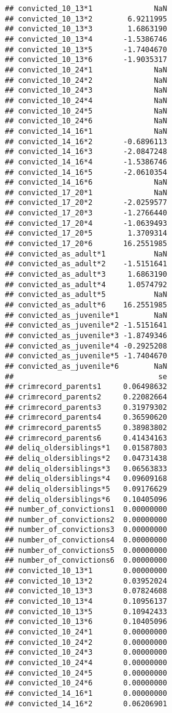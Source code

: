 \documentclass[]{tufte-handout}
\begin{document}
\begin{verbatim}
## convicted_10_13*1              NaN
## convicted_10_13*2        6.9211995
## convicted_10_13*3        1.6863190
## convicted_10_13*4       -1.5386746
## convicted_10_13*5       -1.7404670
## convicted_10_13*6       -1.9035317
## convicted_10_24*1              NaN
## convicted_10_24*2              NaN
## convicted_10_24*3              NaN
## convicted_10_24*4              NaN
## convicted_10_24*5              NaN
## convicted_10_24*6              NaN
## convicted_14_16*1              NaN
## convicted_14_16*2       -0.6896113
## convicted_14_16*3       -2.0847248
## convicted_14_16*4       -1.5386746
## convicted_14_16*5       -2.0610354
## convicted_14_16*6              NaN
## convicted_17_20*1              NaN
## convicted_17_20*2       -2.0259577
## convicted_17_20*3       -1.2766440
## convicted_17_20*4       -1.0639493
## convicted_17_20*5        1.3709314
## convicted_17_20*6       16.2551985
## convicted_as_adult*1           NaN
## convicted_as_adult*2    -1.5151641
## convicted_as_adult*3     1.6863190
## convicted_as_adult*4     1.0574792
## convicted_as_adult*5           NaN
## convicted_as_adult*6    16.2551985
## convicted_as_juvenile*1        NaN
## convicted_as_juvenile*2 -1.5151641
## convicted_as_juvenile*3 -1.8749346
## convicted_as_juvenile*4 -0.2925208
## convicted_as_juvenile*5 -1.7404670
## convicted_as_juvenile*6        NaN
##                                 se
## crimrecord_parents1     0.06498632
## crimrecord_parents2     0.22082664
## crimrecord_parents3     0.31979302
## crimrecord_parents4     0.36590620
## crimrecord_parents5     0.38983802
## crimrecord_parents6     0.41434163
## deliq_oldersiblings*1   0.01587803
## deliq_oldersiblings*2   0.04731438
## deliq_oldersiblings*3   0.06563833
## deliq_oldersiblings*4   0.09609168
## deliq_oldersiblings*5   0.09176629
## deliq_oldersiblings*6   0.10405096
## number_of_convictions1  0.00000000
## number_of_convictions2  0.00000000
## number_of_convictions3  0.00000000
## number_of_convictions4  0.00000000
## number_of_convictions5  0.00000000
## number_of_convictions6  0.00000000
## convicted_10_13*1       0.00000000
## convicted_10_13*2       0.03952024
## convicted_10_13*3       0.07824608
## convicted_10_13*4       0.10956137
## convicted_10_13*5       0.10942433
## convicted_10_13*6       0.10405096
## convicted_10_24*1       0.00000000
## convicted_10_24*2       0.00000000
## convicted_10_24*3       0.00000000
## convicted_10_24*4       0.00000000
## convicted_10_24*5       0.00000000
## convicted_10_24*6       0.00000000
## convicted_14_16*1       0.00000000
## convicted_14_16*2       0.06206901

\end{verbatim}
\end{document}
